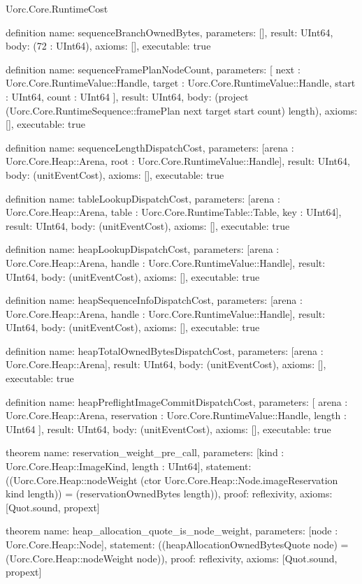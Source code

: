 \begin{lexlean}{Uorc.Core.RuntimeCost}
\begin{semanticmodule}
definition{
  name: sequenceBranchOwnedBytes,
  parameters: [],
  result: UInt64,
  body: (72 : UInt64),
  axioms: [],
  executable: true
}

definition{
  name: sequenceFramePlanNodeCount,
  parameters: [
    next : Uorc.Core.RuntimeValue::Handle,
    target : Uorc.Core.RuntimeValue::Handle,
    start : UInt64,
    count : UInt64
  ],
  result: UInt64,
  body: (project (Uorc.Core.RuntimeSequence::framePlan next target start count) length),
  axioms: [],
  executable: true
}

definition{
  name: sequenceLengthDispatchCost,
  parameters: [arena : Uorc.Core.Heap::Arena, root : Uorc.Core.RuntimeValue::Handle],
  result: UInt64,
  body: (unitEventCost),
  axioms: [],
  executable: true
}

definition{
  name: tableLookupDispatchCost,
  parameters: [arena : Uorc.Core.Heap::Arena, table : Uorc.Core.RuntimeTable::Table, key : UInt64],
  result: UInt64,
  body: (unitEventCost),
  axioms: [],
  executable: true
}

definition{
  name: heapLookupDispatchCost,
  parameters: [arena : Uorc.Core.Heap::Arena, handle : Uorc.Core.RuntimeValue::Handle],
  result: UInt64,
  body: (unitEventCost),
  axioms: [],
  executable: true
}

definition{
  name: heapSequenceInfoDispatchCost,
  parameters: [arena : Uorc.Core.Heap::Arena, handle : Uorc.Core.RuntimeValue::Handle],
  result: UInt64,
  body: (unitEventCost),
  axioms: [],
  executable: true
}

definition{
  name: heapTotalOwnedBytesDispatchCost,
  parameters: [arena : Uorc.Core.Heap::Arena],
  result: UInt64,
  body: (unitEventCost),
  axioms: [],
  executable: true
}

definition{
  name: heapPreflightImageCommitDispatchCost,
  parameters: [
    arena : Uorc.Core.Heap::Arena,
    reservation : Uorc.Core.RuntimeValue::Handle,
    length : UInt64
  ],
  result: UInt64,
  body: (unitEventCost),
  axioms: [],
  executable: true
}

theorem{
  name: reservation_weight_pre_call,
  parameters: [kind : Uorc.Core.Heap::ImageKind, length : UInt64],
  statement: ((Uorc.Core.Heap::nodeWeight (ctor Uorc.Core.Heap::Node.imageReservation kind length)) = (reservationOwnedBytes length)),
  proof: reflexivity{},
  axioms: [Quot.sound, propext]
}

theorem{
  name: heap_allocation_quote_is_node_weight,
  parameters: [node : Uorc.Core.Heap::Node],
  statement: ((heapAllocationOwnedBytesQuote node) = (Uorc.Core.Heap::nodeWeight node)),
  proof: reflexivity{},
  axioms: [Quot.sound, propext]
}


\end{semanticmodule}
\end{lexlean}

